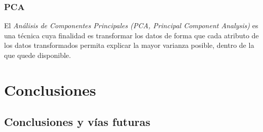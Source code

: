 \documentclass[ oneside,openany,titlepage,numbers=noenddot,headinclude,%
                footinclude=true,cleardoublepage=empty,abstractoff, %
                BCOR=5mm,paper=a4,fontsize=11pt,%
                spanish,american%
                ]{scrreprt}
\begin{document}
\section{PCA}

El \emph{Análisis de Componentes Principales (PCA, Principal Component Analysis)} es una técnica cuya finalidad es transformar los datos de forma que cada atributo de los datos transformados permita explicar la mayor varianza posible, dentro de la que quede disponible.


\part{Conclusiones}

\chapter{Conclusiones y vías futuras}\label{ch:conclusions}


\appendix
\cleardoublepage
%
%
\end{document}

